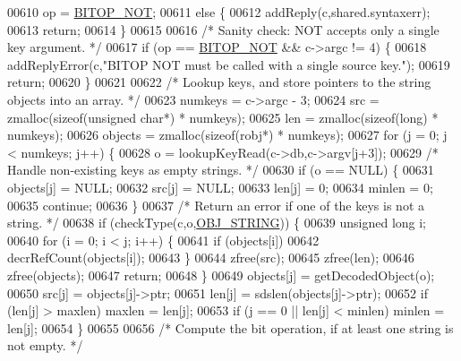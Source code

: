 \begin{DoxyCode}
{00610         op = \hyperlink{bitops_8c_a4fa18b2ac29f1722d9db66461bed3288}{BITOP\_NOT};
00611     \textcolor{keywordflow}{else} \{
00612         addReply(c,shared.syntaxerr);
00613         \textcolor{keywordflow}{return};
00614     \}
00615 
00616     \textcolor{comment}{/* Sanity check: NOT accepts only a single key argument. */}
00617     \textcolor{keywordflow}{if} (op == \hyperlink{bitops_8c_a4fa18b2ac29f1722d9db66461bed3288}{BITOP\_NOT} && c->argc != 4) \{
00618         addReplyError(c,\textcolor{stringliteral}{"BITOP NOT must be called with a single source key."});
00619         \textcolor{keywordflow}{return};
00620     \}
00621 
00622     \textcolor{comment}{/* Lookup keys, and store pointers to the string objects into an array. */}
00623     numkeys = c->argc - 3;
00624     src = zmalloc(\textcolor{keyword}{sizeof}(\textcolor{keywordtype}{unsigned} \textcolor{keywordtype}{char}*) * numkeys);
00625     len = zmalloc(\textcolor{keyword}{sizeof}(\textcolor{keywordtype}{long}) * numkeys);
00626     objects = zmalloc(\textcolor{keyword}{sizeof}(robj*) * numkeys);
00627     \textcolor{keywordflow}{for} (j = 0; j < numkeys; j++) \{
00628         o = lookupKeyRead(c->db,c->argv[j+3]);
00629         \textcolor{comment}{/* Handle non-existing keys as empty strings. */}
00630         \textcolor{keywordflow}{if} (o == NULL) \{
00631             objects[j] = NULL;
00632             src[j] = NULL;
00633             len[j] = 0;
00634             minlen = 0;
00635             \textcolor{keywordflow}{continue};
00636         \}
00637         \textcolor{comment}{/* Return an error if one of the keys is not a string. */}
00638         \textcolor{keywordflow}{if} (checkType(c,o,\hyperlink{server_8h_a65236ea160f69cdef33ec942092af88f}{OBJ\_STRING})) \{
00639             \textcolor{keywordtype}{unsigned} \textcolor{keywordtype}{long} i;
00640             \textcolor{keywordflow}{for} (i = 0; i < j; i++) \{
00641                 \textcolor{keywordflow}{if} (objects[i])
00642                     decrRefCount(objects[i]);
00643             \}
00644             zfree(src);
00645             zfree(len);
00646             zfree(objects);
00647             \textcolor{keywordflow}{return};
00648         \}
00649         objects[j] = getDecodedObject(o);
00650         src[j] = objects[j]->ptr;
00651         len[j] = sdslen(objects[j]->ptr);
00652         \textcolor{keywordflow}{if} (len[j] > maxlen) maxlen = len[j];
00653         \textcolor{keywordflow}{if} (j == 0 || len[j] < minlen) minlen = len[j];
00654     \}
00655 
00656     \textcolor{comment}{/* Compute the bit operation, if at least one string is not empty. */}
}
\end{DoxyCode}
